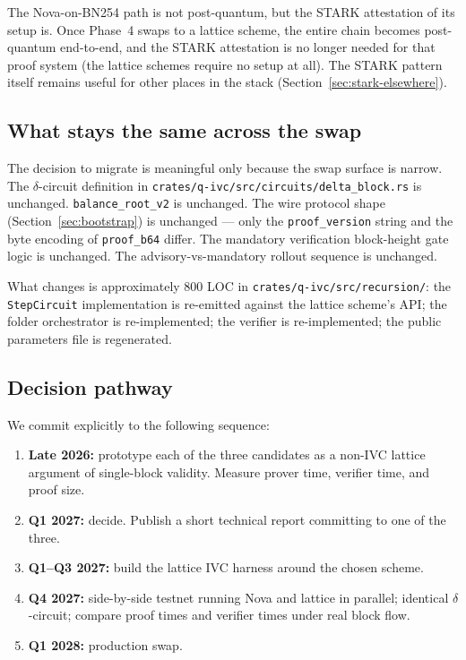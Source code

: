 \documentclass[11pt,a4paper]{article}
\begin{document}
The Nova-on-BN254 path is not post-quantum, but the STARK attestation of
its setup is. Once Phase~4 swaps to a lattice scheme, the entire chain
becomes post-quantum end-to-end, and the STARK attestation is no longer
needed for that proof system (the lattice schemes require no setup at all).
The STARK pattern itself remains useful for other places in the stack
(Section~\ref{sec:stark-elsewhere}).

\subsection{What stays the same across the swap}

The decision to migrate is meaningful only because the swap surface is
narrow. The $\delta$-circuit definition in
\texttt{crates/q-ivc/src/circuits/delta\_block.rs} is unchanged.
\texttt{balance\_root\_v2} is unchanged. The wire protocol shape
(Section~\ref{sec:bootstrap}) is unchanged --- only the
\texttt{proof\_version} string and the byte encoding of \texttt{proof\_b64}
differ. The mandatory verification block-height gate logic is unchanged.
The advisory-vs-mandatory rollout sequence is unchanged.

What changes is approximately 800 LOC in
\texttt{crates/q-ivc/src/recursion/}: the \texttt{StepCircuit}
implementation is re-emitted against the lattice scheme's API; the
folder orchestrator is re-implemented; the verifier is re-implemented;
the public parameters file is regenerated.

\subsection{Decision pathway}

We commit explicitly to the following sequence:

\begin{enumerate}[leftmargin=*]
  \item \textbf{Late 2026:} prototype each of the three candidates as a
        non-IVC lattice argument of single-block validity. Measure
        prover time, verifier time, and proof size.
  \item \textbf{Q1 2027:} decide. Publish a short technical report
        committing to one of the three.
  \item \textbf{Q1--Q3 2027:} build the lattice IVC harness around the
        chosen scheme.
  \item \textbf{Q4 2027:} side-by-side testnet running Nova and lattice
        in parallel; identical $\delta$-circuit; compare proof times
        and verifier times under real block flow.
  \item \textbf{Q1 2028:} production swap.
\end{enumerate}
\end{document}
